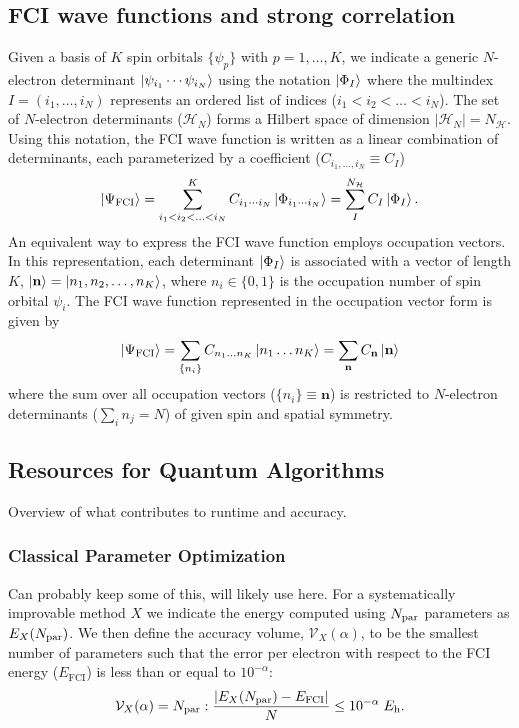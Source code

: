 \documentclass[aip,jcp,amsmath,amssymb, reprint]{revtex4-1}
\newcommand*{\nfci}{N_\mathcal{H}}
\newcommand*{\ncomp}{\mathcal{V}_X}
\begin{document}
\subsection{FCI wave functions and strong correlation}
\label{sec:fci_wf}
Given a basis of $K$ spin orbitals $\{\psi_p\}$ with $p = 1,\ldots,K$, we indicate a generic $N$-electron determinant $\ket{\psi_{i_1}\cdots\psi_{i_N}}$ using the notation $\ket{\Phi_I}$ where the multindex $I = (i_1,\ldots,i_N)$ represents an ordered list of indices ($i_1 < i_2 < \ldots < i_N$).
The set of $N$-electron determinants ($\mathcal{H}_N$) forms a Hilbert space of dimension $|\mathcal{H}_N| = \nfci$.
Using this notation, the FCI wave function is written as a linear combination of determinants, each parameterized by a coefficient ($C_{i_1,\ldots,i_N} \equiv C_{I} $)
\begin{equation}
\ket{\Psi_{\text{FCI}}} = \sum_{i_1 < i_2 < \ldots < i_N}^{K} C_{i_1 \cdots i_N} \ket{\Phi_{i_1 \cdots i_N}}  = \sum_{I}^{\nfci} C_{I} \ket{\Phi_{I}} 
\label{eq:fci_def1}.
\end{equation}
An equivalent way to express the FCI wave function employs occupation vectors.
In this representation, each determinant $\ket{\Phi_I}$ is associated with a vector of length $K$, $\ket{\mathbf{n}} =\ket{n_1, n_2, \ldots, n_K}$, where $n_i \in \{0,1\}$ is the occupation number of spin orbital $\psi_i$.
The FCI wave function represented in the occupation vector form is given by
\begin{equation}
\ket{\Psi_{\text{FCI}}}  = \sum_{\{  n_{i}\}} C_{n_{1} \ldots n_{K}} \ket{n_{1} \ldots n_{K}}
= \sum_{\mathbf{n}} C_{\mathbf{n}} \ket{\mathbf{n}}
\end{equation}
where the sum over all occupation vectors ($\{  n_{i}\} \equiv \mathbf{n}$) is restricted to $N$-electron determinants ($\sum_i n_j = N$) of given spin and spatial symmetry.

\subsection{Resources for Quantum Algorithms}
Overview of what contributes to runtime and accuracy.

\subsubsection{Classical Parameter Optimization}
Can probably keep some of this, will likely use here.
For a systematically improvable method $X$ we indicate the energy computed using $N_{\rm{par}}$  parameters as $E_X(N_{\rm{par}})$. We then define the accuracy volume, $\ncomp(\alpha)$, to be the smallest number of parameters such that the error per electron with respect to the FCI energy ($E_\mathrm{FCI}$) is less than or equal to $10^{-\alpha}$:
\begin{equation}
\label{eq:Vx}
\ncomp(\alpha) = N_{\rm{par}} : \frac{ |E_X(N_{\rm{par}}) - E_\mathrm{FCI}|}{N} \leq  10^{-\alpha}  \; E_\mathrm{h}.
\end{equation}
\end{document}
